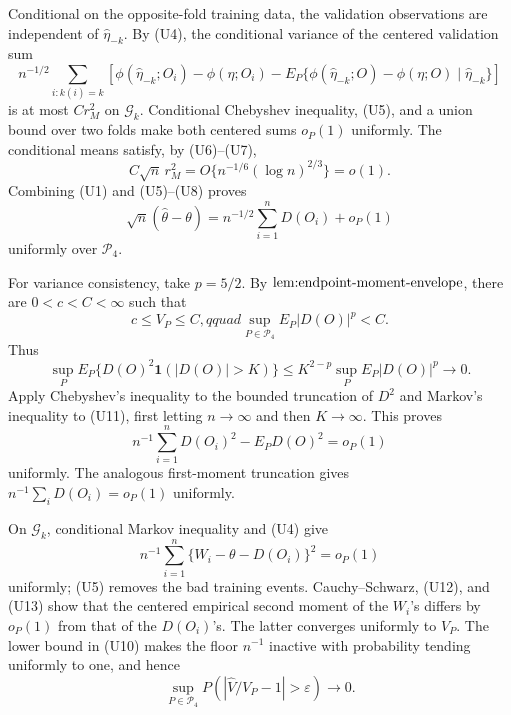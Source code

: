 Conditional on the opposite-fold training data, the validation observations are independent of \(\widehat\eta_{-k}\).  By (U4), the conditional variance of the centered validation sum
\[
 n^{-1/2}\sum_{i:k(i)=k}\left[
 \phi(\widehat\eta_{-k};O_i)-\phi(\eta;O_i)
 -E_P\{\phi(\widehat\eta_{-k};O)-\phi(\eta;O)\mid\widehat\eta_{-k}\}
 \right]
\]
is at most \(Cr_M^2\) on \(\mathcal G_k\).  Conditional Chebyshev inequality, (U5), and a union bound over two folds make both centered sums \(o_P(1)\) uniformly.  The conditional means satisfy, by (U6)--(U7),
\[
 C\sqrt n\,r_M^2=O\{n^{-1/6}(\log n)^{2/3}\}=o(1).                    \tag{U8}
\]
Combining (U1) and (U5)--(U8) proves
\[
 \sqrt n(\widehat\theta-\theta)
 =n^{-1/2}\sum_{i=1}^nD(O_i)+o_P(1)                                   \tag{U9}
\]
uniformly over \(\mathcal P_4\).

For variance consistency, take \(p=5/2\).  By \(\textnormal{lem:endpoint-moment-envelope}\), there are \(0<c<C<\infty\) such that
\[
 c\le V_P\le C,qquad \sup_{P\in\mathcal P_4}E_P|D(O)|^p<C.          \tag{U10}
\]
Thus
\[
 \sup_P E_P\{D(O)^2\mathbf 1(|D(O)|>K)\}
 \le K^{2-p}\sup_PE_P|D(O)|^p\longrightarrow0.                       \tag{U11}
\]
Apply Chebyshev's inequality to the bounded truncation of \(D^2\) and Markov's inequality to (U11), first letting \(n\to\infty\) and then \(K\to\infty\).  This proves
\[
 n^{-1}\sum_{i=1}^nD(O_i)^2-E_PD(O)^2=o_P(1)                           \tag{U12}
\]
uniformly.  The analogous first-moment truncation gives \(n^{-1}\sum_iD(O_i)=o_P(1)\) uniformly.

On \(\mathcal G_k\), conditional Markov inequality and (U4) give
\[
 n^{-1}\sum_{i=1}^n\{W_i-\theta-D(O_i)\}^2=o_P(1)                    \tag{U13}
\]
uniformly; (U5) removes the bad training events.  Cauchy--Schwarz, (U12), and (U13) show that the centered empirical second moment of the \(W_i\)'s differs by \(o_P(1)\) from that of the \(D(O_i)\)'s.  The latter converges uniformly to \(V_P\).  The lower bound in (U10) makes the floor \(n^{-1}\) inactive with probability tending uniformly to one, and hence
\[
 \sup_{P\in\mathcal P_4}P\!\left(\left|\widehat V/V_P-1\right|>\varepsilon\right)
 \longrightarrow0.                                                    \tag{U14}
\]

